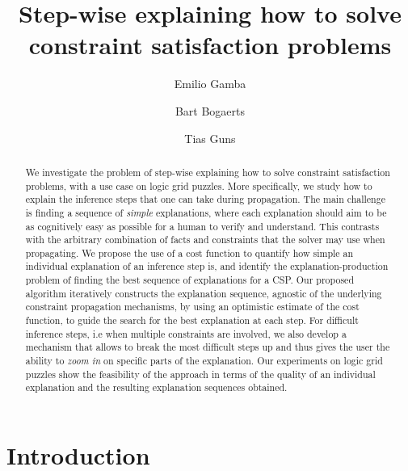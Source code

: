 \documentclass{llncs}
\begin{document}
%
\title{Step-wise explaining how to solve constraint satisfaction problems}
%
%
\author{Emilio Gamba \and
Bart Bogaerts \and
Tias Guns}

%
\maketitle

\begin{abstract}
We investigate the problem of step-wise explaining how to solve constraint satisfaction problems, with a use case on logic grid puzzles.
More specifically, we study how to explain the inference steps that one can take during propagation.
The main challenge is finding a sequence of \textit{simple} explanations, where each explanation should aim to be as cognitively easy as possible for a human to verify and understand.
This contrasts with the arbitrary combination of facts and constraints that the solver may use  when propagating.
We propose the use of a cost function to quantify how simple an individual explanation of an inference step is, and identify the explanation-production problem of finding the best sequence of explanations for a CSP.
Our proposed algorithm iteratively constructs the explanation sequence, agnostic of the underlying constraint propagation mechanisms, by using an optimistic estimate of the cost function, to guide the search for the best explanation at each step.
For difficult inference steps, i.e when multiple constraints are involved, we also develop a mechanism that allows to break the most difficult steps up and thus gives the user the ability to \emph{zoom in} on specific parts of the explanation.
Our experiments on logic grid puzzles show the feasibility of the approach in terms of the quality of an individual explanation and the resulting explanation sequences obtained.
\end{abstract}
%
%
\section{Introduction}\label{sec:intro}

\end{document}
